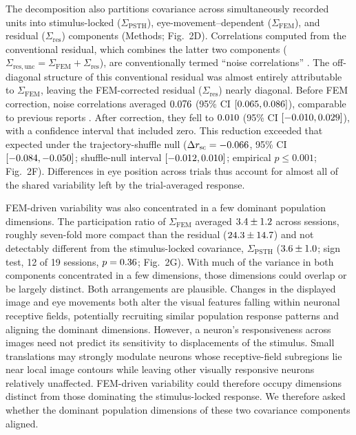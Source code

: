 \documentclass{lite}
\newcommand{\Cpsth}{\Sigma_{\text{PSTH}}}
\newcommand{\Cfem}{\Sigma_{\text{FEM}}}
\begin{document}
The decomposition also partitions covariance across simultaneously recorded units into stimulus-locked ($\Cpsth$), eye-movement--dependent ($\Cfem$), and residual ($\Sigma_{\mathrm{res}}$) components (Methods; Fig.~2D). Correlations computed from the conventional residual, which combines the latter two components ($\Sigma_{\mathrm{res,unc}} = \Cfem + \Sigma_{\mathrm{res}}$), are conventionally termed ``noise correlations'' \cite{cohen2011measuring, kohn2005stimulus}. The off-diagonal structure of this conventional residual was almost entirely attributable to $\Cfem$, leaving the FEM-corrected residual ($\Sigma_{\mathrm{res}}$) nearly diagonal. Before FEM correction, noise correlations averaged $0.076$ (95\% CI $[0.065, 0.086]$), comparable to previous reports \cite{smith2008spatial, mitchell2009spatial}. After correction, they fell to $0.010$ (95\% CI $[-0.010, 0.029]$), with a confidence interval that included zero. This reduction exceeded that expected under the trajectory-shuffle null ($\Delta r_\mathrm{sc} = -0.066$, 95\% CI $[-0.084, -0.050]$; shuffle-null interval $[-0.012, 0.010]$; empirical $p \leq 0.001$; Fig.~2F). Differences in eye position across trials thus account for almost all of the shared variability left by the trial-averaged response.

FEM-driven variability was also concentrated in a few dominant population dimensions. The participation ratio of $\Cfem$ averaged $3.4\pm1.2$ across sessions, roughly seven-fold more compact than the residual ($24.3\pm14.7$) and not detectably different from the stimulus-locked covariance, $\Cpsth$ ($3.6\pm1.0$; sign test, 12 of 19 sessions, $p = 0.36$; Fig.~2G). With much of the variance in both components concentrated in a few dimensions, those dimensions could overlap or be largely distinct. Both arrangements are plausible. Changes in the displayed image and eye movements both alter the visual features falling within neuronal receptive fields, potentially recruiting similar population response patterns and aligning the dominant dimensions. However, a neuron's responsiveness across images need not predict its sensitivity to displacements of the stimulus. Small translations may strongly modulate neurons whose receptive-field subregions lie near local image contours while leaving other visually responsive neurons relatively unaffected. FEM-driven variability could therefore occupy dimensions distinct from those dominating the stimulus-locked response. We therefore asked whether the dominant population dimensions of these two covariance components aligned.
\end{document}
